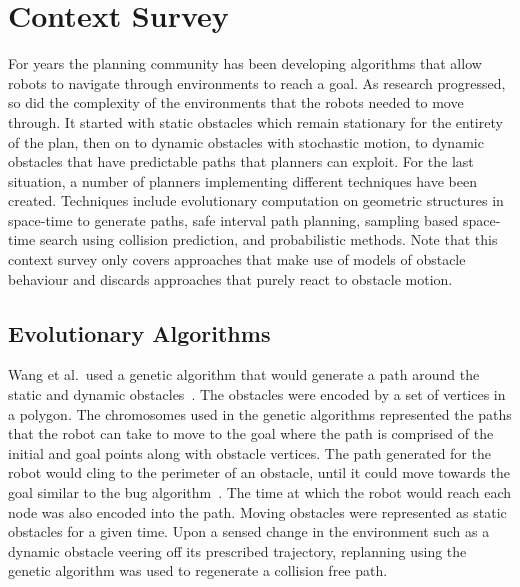 


\chapter{Context Survey}

\label{chapter:contextsurvey}

For years the planning community has been developing algorithms that allow
robots to navigate through environments to reach a goal. As research
progressed, so did the complexity of the environments that the robots needed to
move through. It started with static obstacles which remain stationary for the
entirety of the plan, then on to dynamic obstacles with stochastic motion, to
dynamic obstacles that have predictable paths that planners can exploit. For
the last situation, a number of planners implementing different techniques have
been created. Techniques include evolutionary computation on geometric
structures in space-time to generate paths, safe interval path planning,
sampling based space-time search using collision prediction, and probabilistic
methods. Note that this context survey only covers approaches that make use of
models of obstacle behaviour and discards approaches that purely react to
obstacle motion.

\section{Evolutionary Algorithms}

Wang et al.\ used a genetic algorithm that would generate a path around the
static and dynamic obstacles~\cite{wang2007mobile}. The obstacles were encoded
by a set of vertices in a polygon. The chromosomes used in the genetic
algorithms represented the paths that the robot can take to move to the goal
where the path is comprised of the initial and goal points along with obstacle
vertices.  The path generated for the robot would cling to the perimeter of an
obstacle, until it could move towards the goal similar to the bug
algorithm~\cite{weir}. The time at which the robot would reach each node was
also encoded into the path. Moving obstacles were represented as static
obstacles for a given time. Upon a sensed change in the environment such as a
dynamic obstacle veering off its prescribed trajectory, replanning using the
genetic algorithm was used to regenerate a collision free path.

